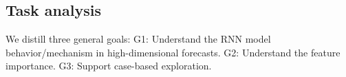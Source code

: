 \subsection{Task analysis}
\label{section:design_tasks}
We distill three general goals: 
G1: Understand the RNN model behavior/mechanism in high-dimensional forecasts. 
G2: Understand the feature importance. 
G3: Support case-based exploration.
